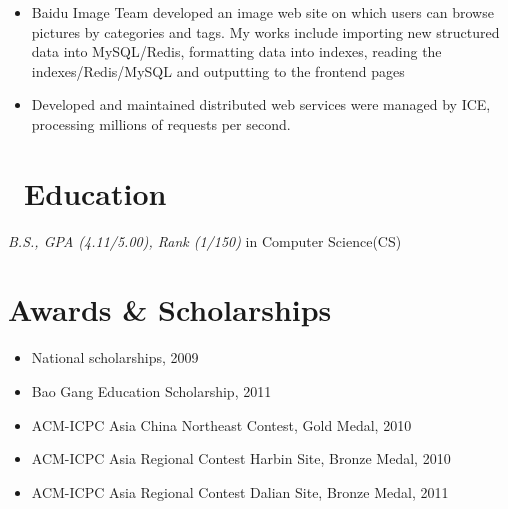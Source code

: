 \documentclass{resume}
\begin{document}
 {}{}
\begin{itemize}
    \item Baidu Image Team developed an image web site on which users can browse pictures by categories and tags. My works include importing new structured data into MySQL/Redis, formatting data into indexes, reading the indexes/Redis/MySQL and outputting to the frontend pages
\end{itemize}

 {}{}
\begin{itemize}
    \item  Developed and maintained distributed web services were managed by ICE, processing millions of requests per second.
\end{itemize}

\section{\faGraduationCap\ Education}
\textit{B.S.,  GPA (4.11/5.00), Rank (1/150)} in Computer Science(CS)

\section{Awards \& Scholarships}
\begin{itemize}
    \item National scholarships, 2009
    \item Bao Gang Education Scholarship, 2011
    \item ACM-ICPC Asia China Northeast Contest, Gold Medal, 2010
    \item ACM-ICPC Asia Regional Contest Harbin Site, Bronze Medal, 2010
    \item ACM-ICPC Asia Regional Contest Dalian Site, Bronze Medal, 2011
\end{itemize}
\end{document}
